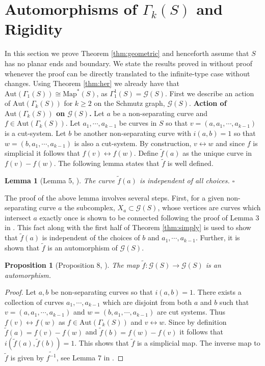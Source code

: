\documentclass[11pt]{article}
\def\lr{\leftrightarrow}
\def\map{\text{Map}}
\def\Aut{\text{Aut}}
\newtheorem{proposition}[theorem]{Proposition}
\newtheorem{lemma}[theorem]{Lemma}
\begin{document}
\section{Automorphisms of $\Gamma_k(S)$ and Rigidity}\label{aut}
In this section we prove Theorem \ref{thm:geometric} and henceforth assume that $S$ has no planar ends and boundary. We state the results proved in \cite{irmak2004} without proof whenever the proof can be directly translated to the infinite-type case without changes. Using Theorem \ref{thm:her} we already have that $\Aut(\Gamma_1(S)) \cong \map^*(S)$, as $\Gamma^1_1(S)= \mathcal{G}(S)$. First we describe an action of $\Aut(\Gamma_k(S))$ for $k\geq 2$ on the Schmutz graph, $\mathcal{G}(S)$.
\vspace{0.5em}
\newline
\textbf{Action of $\text{Aut}(\Gamma_k(S))$ on $\mathcal{G}(S)$.} Let $a$ be a non-separating curve and $f\in \Aut(\Gamma_k(S))$. Let $a_1,\cdots, a_{k-1}$ be curves in $S$ so that $v = (a,a_1,\cdots, a_{k-1})$ is a cut-system. Let $b$ be another non-separating curve with $i(a,b) = 1$ so that $w = (b,a_1, \cdots, a_{k-1})$ is also a cut-system. By construction, $v \lr w$ and since $f$ is simplicial it follows that $f(v) \lr f(w)$. Define $\tilde{f}(a)$ as the unique curve in $f(v) - f(w)$. The following lemma states that $\tilde{f}$ is well defined.
\begin{lemma}[Lemma 5, \cite{irmak2004}]
  The curve $\tilde{f}(a)$ is independent of all choices. $\square$
\end{lemma}
The proof of the above lemma involves several steps. First, for a given non-separating curve $a$ the subcomplex, $X_a\subset \mathcal{G}(S)$, whose vertices are curves which intersect $a$ exactly once is shown to be connected following the proof of Lemma 3 in \cite{irmak2004}. This fact along with the first half of Theorem \ref{thm:simply} is used to show that $\tilde{f}(a)$ is independent of the choices of $b$ and $a_1,\cdots, a_{k-1}$. Further, it is shown that $\tilde{f}$ is an automorphism of $ \mathcal{G}(S)$.
\begin{proposition}[Proposition 8, \cite{irmak2004}] \label{prop:simp}
  The map $\tilde{f}: \mathcal{G}(S) \to \mathcal{G}(S)$ is an automorphism. 
\end{proposition}
\begin{proof}
  Let $a,b$ be non-separating curves so that $i(a,b)=1$. There exists a collection of curves $a_1, \cdots, a_{k-1}$ which are disjoint from both $a$ and $b$ such that $v =(a, a_1, \cdots, a_{k-1})$ and $w = (b, a_1, \cdots, a_{k-1})$ are cut systems. Thus $f(v) \leftrightarrow f(w)$ as $f\in \Aut(\Gamma_k(S))$ and $v\leftrightarrow w$. Since by definition $\tilde{f}(a) = f(v)-f(w)$ and $\tilde{f}(b) = f(w) - f(v)$ it follows that $i(\tilde{f}(a), \tilde{f}(b)) = 1$. This shows that $\tilde{f}$ is a simplicial map. The inverse map to $\tilde{f}$ is given by $\widetilde{f^{-1}}$, see Lemma 7 in \cite{irmak2004}.
\end{proof}
\end{document}
